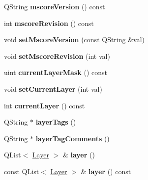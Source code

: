 \begin{DoxyCompactItemize}
\item 
\mbox{\label{class_ms_1_1_score_ae3dd545ff5c9a02d72df8d9d3f058e08}} 
Q\+String {\bfseries mscore\+Version} () const
\item 
\mbox{\label{class_ms_1_1_score_a497c9f24fbe494d5414f0918ad27d955}} 
int {\bfseries mscore\+Revision} () const
\item 
\mbox{\label{class_ms_1_1_score_a29eb44f210fbd0232928b178f6ea827b}} 
void {\bfseries set\+Mscore\+Version} (const Q\+String \&val)
\item 
\mbox{\label{class_ms_1_1_score_ad5b692892355c17c1305faa0dbdf4464}} 
void {\bfseries set\+Mscore\+Revision} (int val)
\item 
\mbox{\label{class_ms_1_1_score_a5fe5849053e609944418782e5140f723}} 
uint {\bfseries current\+Layer\+Mask} () const
\item 
\mbox{\label{class_ms_1_1_score_ad3c3c212c81e446bc31d60eb8d36873b}} 
void {\bfseries set\+Current\+Layer} (int val)
\item 
\mbox{\label{class_ms_1_1_score_a2d4afa6682974ad93eb40340c5f951c1}} 
int {\bfseries current\+Layer} () const
\item 
\mbox{\label{class_ms_1_1_score_ab6fe3c81f6be8f49726dd6b4e4928912}} 
Q\+String $\ast$ {\bfseries layer\+Tags} ()
\item 
\mbox{\label{class_ms_1_1_score_afbbf10f98745807046a016e09d03b98a}} 
Q\+String $\ast$ {\bfseries layer\+Tag\+Comments} ()
\item 
\mbox{\label{class_ms_1_1_score_a67e0858003e10756b560df981bea9b61}} 
Q\+List$<$ \hyperlink{struct_ms_1_1_layer}{Layer} $>$ \& {\bfseries layer} ()
\item 
\mbox{\label{class_ms_1_1_score_a258303b5b7e72f05a8213255d4d2efcb}} 
const Q\+List$<$ \hyperlink{struct_ms_1_1_layer}{Layer} $>$ \& {\bfseries layer} () const

\end{DoxyCompactItemize}
